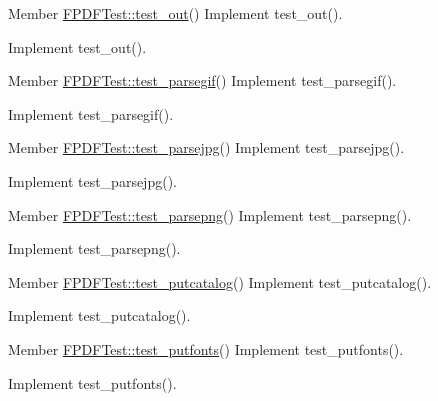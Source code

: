 \begin{DoxyDescription}
\item[Member \hyperlink{class_f_p_d_f_test_a263b95de6b1589a6968177b6f4e5bbba}{FPDFTest::test\_\-out}() ]Implement test\_\-out().

Implement test\_\-out().
\end{DoxyDescription}

\label{todo__todo000211}
\hypertarget{todo__todo000211}{}
 
\begin{DoxyDescription}
\item[Member \hyperlink{class_f_p_d_f_test_af72e7607c068f8a80bda329a1b0e7159}{FPDFTest::test\_\-parsegif}() ]Implement test\_\-parsegif().

Implement test\_\-parsegif().
\end{DoxyDescription}

\label{todo__todo000207}
\hypertarget{todo__todo000207}{}
 
\begin{DoxyDescription}
\item[Member \hyperlink{class_f_p_d_f_test_adb9be70e47ea84877ba349e4e991232e}{FPDFTest::test\_\-parsejpg}() ]Implement test\_\-parsejpg().

Implement test\_\-parsejpg().
\end{DoxyDescription}

\label{todo__todo000208}
\hypertarget{todo__todo000208}{}
 
\begin{DoxyDescription}
\item[Member \hyperlink{class_f_p_d_f_test_acb8f9e83c060ad33d3c2147af6d37f06}{FPDFTest::test\_\-parsepng}() ]Implement test\_\-parsepng().

Implement test\_\-parsepng().
\end{DoxyDescription}

\label{todo__todo000222}
\hypertarget{todo__todo000222}{}
 
\begin{DoxyDescription}
\item[Member \hyperlink{class_f_p_d_f_test_ae9ce0876d92402b3af7bdddea902e183}{FPDFTest::test\_\-putcatalog}() ]Implement test\_\-putcatalog().

Implement test\_\-putcatalog().
\end{DoxyDescription}

\label{todo__todo000216}
\hypertarget{todo__todo000216}{}
 
\begin{DoxyDescription}
\item[Member \hyperlink{class_f_p_d_f_test_a305b1672cfb0f28cd890b703c9082e56}{FPDFTest::test\_\-putfonts}() ]Implement test\_\-putfonts().

Implement test\_\-putfonts().
\end{DoxyDescription}

